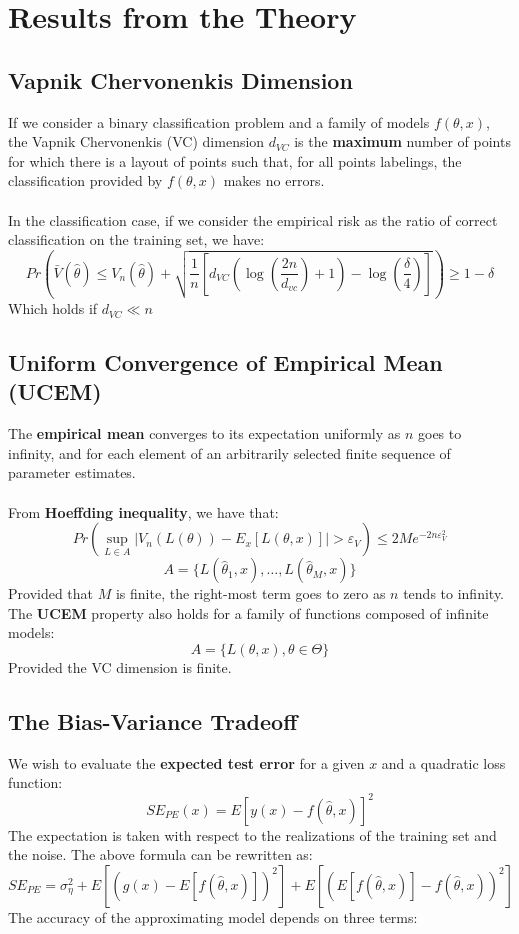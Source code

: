 \documentclass{article}
\begin{document}
\section{Results from the Theory}
\subsection{Vapnik Chervonenkis Dimension}
If we consider a binary classification problem and a family of models $f(\theta, x)$, the Vapnik Chervonenkis (VC) dimension $d_{VC}$ is the \textbf{maximum} number of points for which there is a layout of points such that, for all points labelings, the classification provided by $f(\theta, x)$ makes no errors. \\ \\
In the classification case, if we consider the empirical risk as the ratio of correct classification on the training set, we have:
\[ Pr \left( \displaystyle \bar{V}(\hat \theta) \leq V_n(\hat \theta) + \sqrt{\frac{1}{n} \left[ d_{VC} \left( \log \left( \frac{2n}{d_{vc}} \right) + 1 \right) - \log \left( \frac{\delta}{4} \right) \right]} \right) \geq 1 - \delta \]
Which holds if $d_{VC} \ll n$

\subsection{Uniform Convergence of Empirical Mean (UCEM)}
The \textbf{empirical mean} converges to its expectation uniformly as $n$ goes to infinity, and for each element of an arbitrarily selected finite sequence of parameter estimates. \\ \\
From \textbf{Hoeffding inequality}, we have that:
\[ Pr \left( \sup_{L \in A} |V_n(L(\theta)) - E_x[L(\theta, x)]| > \varepsilon_V \right) \leq 2Me^{-2n\varepsilon^2_V} \]
\[ A = \{ L(\hat \theta_1, x), \dots, L(\hat\theta_M, x) \} \]
Provided that $M$ is finite, the right-most term goes to zero as $n$ tends to infinity. The \textbf{UCEM} property also holds for a family of functions composed of infinite models:
\[ A = \{ L(\theta, x), \theta \in \Theta \} \]
Provided the VC dimension is finite.

\subsection{The Bias-Variance Tradeoff}
We wish to evaluate the \textbf{expected test error} for a given $x$ and a quadratic loss function:
\[ SE_{PE}(x) = E[ y(x) - f(\hat\theta, x) ]^2 \]
The expectation is taken with respect to the realizations of the training set and the noise. The above formula can be rewritten as:
\[ SE_{PE} = \sigma^2_\eta + E \left[ (g(x) - E [f(\hat \theta, x)])^2 \right] + E \left[ (E[f(\hat \theta, x)] - f(\hat \theta, x))^2 \right] \]
The accuracy of the approximating model depends on three terms:
\end{document}
